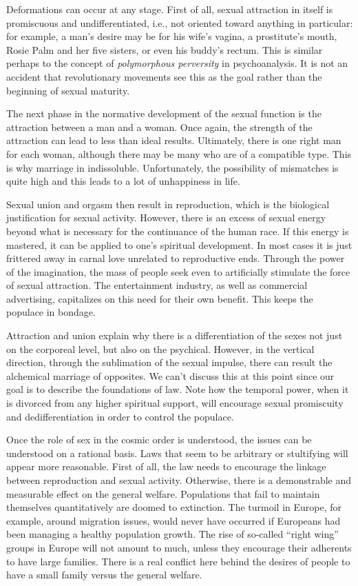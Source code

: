Deformations can occur at any stage. First of all, sexual attraction in itself is promiscuous and undifferentiated, i.e., not oriented toward anything in particular: for example, a man's desire may be for his wife's vagina, a prostitute's mouth, Rosie Palm and her five sisters, or even his buddy's rectum. This is similar perhaps to the concept of \emph{polymorphous perversity} in psychoanalysis. It is not an accident that revolutionary movements see this as the goal rather than the beginning of sexual maturity.

The next phase in the normative development of the sexual function is the attraction between a man and a woman. Once again, the strength of the attraction can lead to less than ideal results. Ultimately, there is one right man for each woman, although there may be many who are of a compatible type. This is why marriage in indissoluble. Unfortunately, the possibility of mismatches is quite high and this leads to a lot of unhappiness in life.

Sexual union and orgasm then result in reproduction, which is the biological justification for sexual activity. However, there is an excess of sexual energy beyond what is necessary for the continuance of the human race. If this energy is mastered, it can be applied to one's spiritual development. In most cases it is just frittered away in carnal love unrelated to reproductive ends. Through the power of the imagination, the mass of people seek even to artificially stimulate the force of sexual attraction. The entertainment industry, as well as commercial advertising, capitalizes on this need for their own benefit. This keeps the populace in bondage.

Attraction and union explain why there is a differentiation of the sexes not just on the corporeal level, but also on the psychical. However, in the vertical direction, through the sublimation of the sexual impulse, there can result the alchemical marriage of opposites. We can't discuss this at this point since our goal is to describe the foundations of law. Note how the temporal power, when it is divorced from any higher spiritual support, will encourage sexual promiscuity and dedifferentiation in order to control the populace.

Once the role of sex in the cosmic order is understood, the issues can be understood on a rational basis. Laws that seem to be arbitrary or stultifying will appear more reasonable. First of all, the law needs to encourage the linkage between reproduction and sexual activity. Otherwise, there is a demonstrable and measurable effect on the general welfare. Populations that fail to maintain themselves quantitatively are doomed to extinction. The turmoil in Europe, for example, around migration issues, would never have occurred if Europeans had been managing a healthy population growth. The rise of so-called ``right wing'' groups in Europe will not amount to much, unless they encourage their adherents to have large families. There is a real conflict here behind the desires of people to have a small family versus the general welfare.

